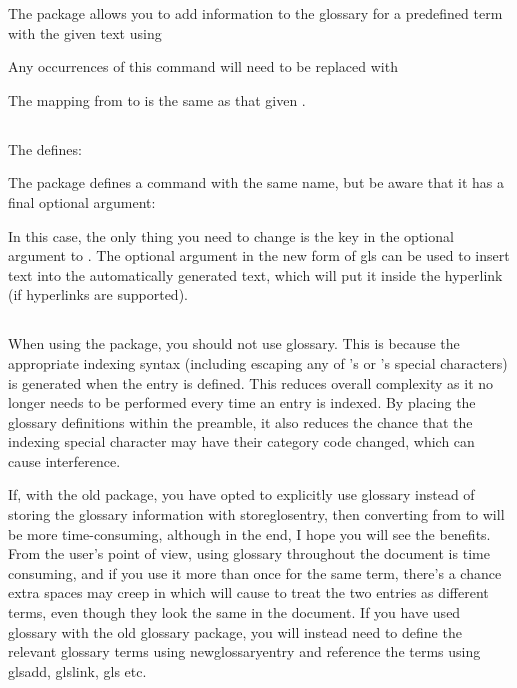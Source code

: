 \documentclass[titlepage=false,oneside,
 fontsize=12pt,captions=tableheading]{scrarticle}
\newenvironment{oldway}
{\begin{codebox*}[title={\styfmt{glossary.sty}}]}
{\end{codebox*}}
\newenvironment{newway}
{\begin{codebox*}[title={\styfmt{glossaries.sty}}]}
{\end{codebox*}}
\begin{document}
The  package allows you to add information to the
glossary for a predefined term with the given text using
\begin{oldway}
\end{oldway}%
Any occurrences of this command will need to be replaced with
\begin{newway}
\end{newway}%
The mapping from  to  is
the same as that given .

\subsection{}

The  defines:
\begin{oldway}
\end{oldway}
The  package defines a command with the same
name, but be aware that it has a final optional argument:
\begin{newway}
\end{newway}
In this case, the only thing you need to
change is the  key in the optional argument
to . The  optional argument in the 
new form of \gls{gls} can be used to insert text into the
automatically generated text, which will put it inside the hyperlink
(if hyperlinks are supported).

\subsection{}
\label{sec:csglossary}

When using the  package, you should not use
\gls{glossary}. This is because the appropriate indexing syntax (including
escaping any of 's or 's special
characters) is generated when the entry is defined. This reduces
overall complexity as it no longer needs to be performed every time
an entry is indexed. By placing the glossary definitions within the
preamble, it also reduces the chance that the indexing special
character may have their category code changed, which can cause
interference.

If, with the old package, you have opted to
explicitly use \gls{glossary} instead of storing the glossary
information with \gls{storeglosentry}, then converting from
 to  will be more time-consuming,
although in the end, I hope you will see the benefits. From
the user's point of view, using \gls{glossary} throughout the
document is time consuming, and if you use it more than once for the
same term, there's a chance extra spaces may creep in which will
cause  to treat the two entries as different
terms, even though they look the same in the document.  If you have
used \gls{glossary} with the old glossary package, you will instead
need to define the relevant glossary terms using
\gls{newglossaryentry} and reference the terms using
\gls{glsadd}, \gls{glslink}, \gls{gls} etc.
\end{document}
